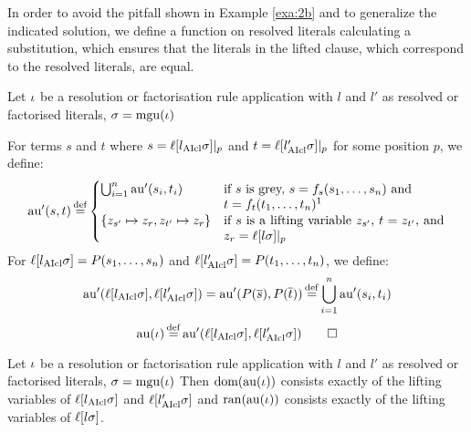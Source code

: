 \documentclass[,%
	draft=false,%
	numbers=noendperiod
	11pt,
	a4paper,
	oneside,%
	openany,
]{memoir}
\begin{document}
In order to avoid the pitfall shown in Example \ref{exa:2b} and to generalize the indicated solution,
we define a function on resolved literals calculating a substitution, which ensures that the literals in the lifted clause, which correspond to the resolved literals, are equal.

\begin{defi}[$\aiu$] 
	Let $\iota$ be a resolution or factorisation rule application with $l$ and $l'$ as resolved or factorised literals, $\sigma = \operatorname{mgu}(\iota)$

	\newcommand{\aiuP}{\aiu'}

	For terms $s$ and $t$ where
	$s = \ell[l_{\operatorname{AIcl}}\sigma]|_{p}$
	and 
	$t = \ell[l'_{\operatorname{AIcl}}\sigma]|_{p}$
	for some position $p$, we define:
	\[
		\aiuP (s, t) \defeq
		\begin{cases}
			\bigcup_{i=1}^n \aiuP(s_i, t_i) &
			\parbox[t]{.50\textwidth}{
			if $s$ is grey, $s=f_s(s_1, \dots, s_n)$ and\newline$t = f_{t}(t_1,\dots, t_n)$\footnotemark} \\
			\{z_{s'} \mapsto z_r, z_{t'} \mapsto z_r\} &
			\parbox[t]{.50\textwidth}{
				if $s$ is a lifting variable $z_{s'}$, $t = z_{t'}$,
				and $z_r = \lifboth{l\sigma}\at{p}$
			}
		\end{cases}
	\]
	For $\ell[l_{\operatorname{AIcl}}\sigma] = P(s_1, \dots, s_n)$ and $\ell[l'_{\operatorname{AIcl}}\sigma] = P(t_1, \dots, t_n)$, we define:
	\[
		\aiuP(\lifboth{l\cl\sigma}, \lifboth{l'\cl\sigma}) = 
		\aiuP(P(\overline s), P(\overline t)) \defeq \bigcup_{i=1}^n \aiuP(s_i, t_i)
	\]
	\[
		\aiu(\inference) \defeq \aiuP(\lifboth{l\cl\sigma}, \lifboth{l'\cl\sigma}) \qedhere
	\]
\end{defi}

\begin{prop}
	\label{prop:tau_dom_ran}
	Let $\iota$ be a resolution or factorisation rule application with $l$ and $l'$ as resolved or factorised literals, $\sigma = \operatorname{mgu}(\iota)$
	Then $\operatorname{dom}(\operatorname{au}(\iota))$ consists exactly of the lifting variables of $\ell[l_{\operatorname{AIcl}}\sigma]$ and $\ell[l'_{\operatorname{AIcl}}\sigma]$ and $\operatorname{ran}(\operatorname{au}(\iota))$ consists exactly of the lifting variables of $\ell[l\sigma]$.
\end{prop}
\end{document}

